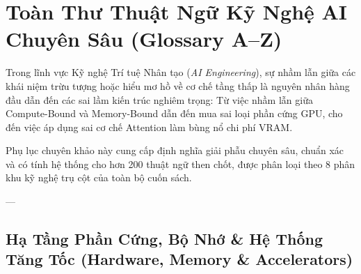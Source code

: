 
\chapter{Toàn Thư Thuật Ngữ Kỹ Nghệ AI Chuyên Sâu (Glossary A--Z)}
\label{ch:appendix-glossary}

Trong lĩnh vực Kỹ nghệ Trí tuệ Nhân tạo (\textit{AI Engineering}), sự nhầm lẫn giữa các khái niệm trừu tượng hoặc hiểu mơ hồ về cơ chế tầng thấp là nguyên nhân hàng đầu dẫn đến các sai lầm kiến trúc nghiêm trọng: Từ việc nhầm lẫn giữa Compute-Bound và Memory-Bound dẫn đến mua sai loại phần cứng GPU, cho đến việc áp dụng sai cơ chế Attention làm bùng nổ chi phí VRAM. 

Phụ lục chuyên khảo này cung cấp định nghĩa giải phẫu chuyên sâu, chuẩn xác và có tính hệ thống cho hơn 200 thuật ngữ then chốt, được phân loại theo 8 phân khu kỹ nghệ trụ cột của toàn bộ cuốn sách.

---

\section{Hạ Tầng Phần Cứng, Bộ Nhớ \& Hệ Thống Tăng Tốc (Hardware, Memory \& Accelerators)}
\label{sec:app-glossary-hardware}

